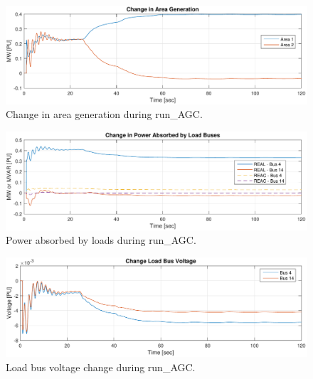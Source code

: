 \begin{figure}[H]
	\centering
	\footnotesize
	\includegraphics[width=\linewidth]{examples/agc/run-AGC-3}
	\caption{Change in area generation during run\_AGC.}
	\label{fig: runAGC area gen}
\end{figure}%


\begin{figure}[H]
	\centering
	\footnotesize
	\includegraphics[width=\linewidth]{examples/agc/run-AGC-4}
	\caption{Power absorbed by loads during run\_AGC.}
	\label{fig: runAGC power}
\end{figure}%

\begin{figure}[H]
	\centering
	\footnotesize
	\includegraphics[width=\linewidth]{examples/agc/run-AGC-5}
	\caption{Load bus voltage change during run\_AGC.}
	\label{fig: runAGC bus v}
\end{figure}%